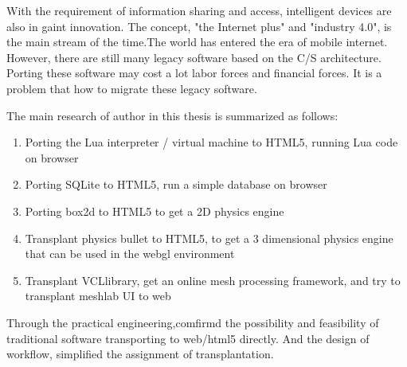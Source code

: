 \begin{eabstract}
With the requirement of information sharing and access,
intelligent devices are also in gaint innovation.
The concept, "the Internet plus" and "industry 4.0",
is the main stream of the time.The world has entered the era of mobile internet.
However, there are still many legacy software based on the C/S architecture.
Porting these software may cost a lot labor forces and financial forces.
It is a problem that how to migrate these legacy software.

\par
The main research of author in this thesis is summarized as follows:

\begin{enumerate}
    \item Porting the Lua interpreter / virtual machine to HTML5, running Lua code on browser
    \item Porting SQLite to HTML5, run a simple database on browser
    \item Porting box2d to HTML5 to get a 2D physics engine
    \item Transplant physics bullet to HTML5, to get a 3 dimensional physics engine that can be used in the webgl environment
    \item Transplant VCLlibrary, get an online mesh processing framework, and try to transplant meshlab UI to web
\end{enumerate}

\par
Through the practical engineering,comfirmd the possibility and feasibility
of traditional software transporting to web/html5 directly.
And the design of workflow, simplified the assignment of transplantation.
\end{eabstract}